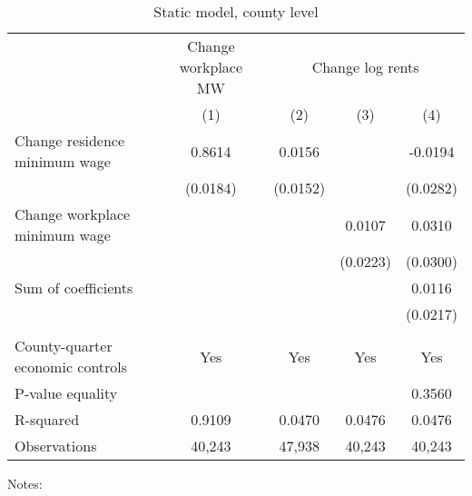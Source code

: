 \begin{table}[hbt!] \centering
    \caption{Static model, county level}
    \label{tab:static_county}

    \begin{tabular}{l*{4}{c}}
    \toprule
                                        & \multicolumn{1}{c}{Change workplace MW}
                                        & \multicolumn{3}{c}{Change log rents}  \\ \cmidrule(lr){2-2}\cmidrule(lr){3-5}
                                              & (1)   & (2)   & (3)   & (4)      \\ \midrule
    Change residence minimum wage             &  0.8614  &  0.0156  &       &  -0.0194     \\
                                              & (0.0184) & (0.0152) &       & (0.0282)    \\
    Change workplace minimum wage             &       &       &  0.0107  & 0.0310      \\
                                              &       &       & (0.0223) & (0.0300)    \\ \midrule
    Sum of coefficients                       &       &       &       &  0.0116     \\
                                              &       &       &       & (0.0217)    \\
                                              &       &       &       &          \\ \midrule
    County-quarter economic controls          &  Yes  & Yes   & Yes   & Yes      \\
    P-value equality                          &       &       &       & 0.3560      \\
    R-squared                                 &  0.9109  &  0.0470  &  0.0476  & 0.0476      \\
    Observations                              & 40,243  & 47,938  & 40,243  & 40,243     \\\bottomrule
    \end{tabular}

    \begin{minipage}{.95\textwidth} \footnotesize
        \vspace{2mm}
        Notes: 
    \end{minipage}
\end{table}
